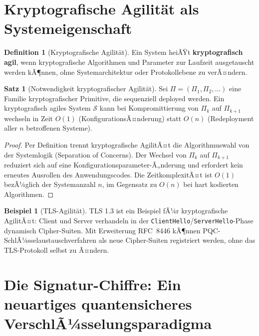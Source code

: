 ﻿\documentclass[a4paper,12pt]{article}
\theoremstyle{definition}
\newtheorem{definition}{Definition}[section]
\newtheorem{beispiel}{Beispiel}[section]
\newtheorem{satz}{Satz}[section]
\begin{document}
\section{Kryptografische Agilit\"at als Systemeigenschaft}

\begin{definition}[Kryptografische Agilit\"at]
Ein System heiÃŸt \textbf{kryptografisch agil}, wenn kryptografische Algorithmen
und Parameter zur Laufzeit ausgetauscht werden kÃ¶nnen, ohne Systemarchitektur
oder Protokollebene zu verÃ¤ndern.
\end{definition}

\begin{satz}[Notwendigkeit kryptografischer Agilit\"at]
Sei $\Pi = (\Pi_1, \Pi_2, \ldots)$ eine Familie kryptografischer Primitive,
die sequenziell deployed werden. Ein kryptografisch agiles System $\mathcal{S}$
kann bei Kompromittierung von $\Pi_k$ auf $\Pi_{k+1}$ wechseln in Zeit $O(1)$
(KonfigurationsÃ¤nderung) statt $O(n)$ (Redeployment aller $n$ betroffenen Systeme).
\end{satz}

\begin{proof}
Per Definition trennt kryptografische AgilitÃ¤t die Algorithmuswahl von der
Systemlogik (Separation of Concerns). Der Wechsel von $\Pi_k$ auf $\Pi_{k+1}$
reduziert sich auf eine Konfigurationsparameter-Ã„nderung und erfordert kein
erneutes Ausrollen des Anwendungscodes. Die ZeitkomplexitÃ¤t ist $O(1)$
bezÃ¼glich der Systemanzahl $n$, im Gegensatz zu $O(n)$ bei hart kodierten
Algorithmen.
\end{proof}

\begin{beispiel}[TLS-Agilit\"at]
TLS 1.3 \cite{Res18} ist ein Beispiel fÃ¼r kryptografische AgilitÃ¤t:
Client und Server verhandeln in der \texttt{ClientHello}/\texttt{ServerHello}-Phase
dynamisch Cipher-Suiten. Mit Erweiterung RFC~8446 kÃ¶nnen PQC-SchlÃ¼sselaustauschverfahren
als neue Cipher-Suiten registriert werden, ohne das TLS-Protokoll selbst zu Ã¤ndern.
\end{beispiel}

\section{Die Signatur-Chiffre: Ein neuartiges quantensicheres VerschlÃ¼sselungsparadigma}
\end{document}
